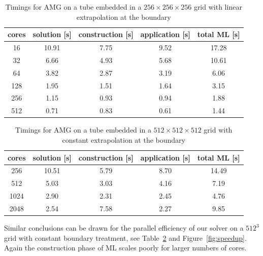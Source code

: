 \documentclass[a4paper,10pt,3p,preprint,pdftex]{elsarticle}
\begin{document}
\begin{table}[htb]
  \begin{center}
    \begin{tabular}{ccccc}
      \hline
      cores & solution [s] & construction [s] & application [s] & total ML [s] \\
      \hline
      16  & 10.91 &  7.75 &  9.52 & 17.28 \\
      32  &  6.66 &  4.93 &  5.68 & 10.61 \\
      64  &  3.82 &  2.87 &  3.19 &  6.06 \\
      128 &  1.95 &  1.51 &  1.64 &  3.15 \\
      256 &  1.15 &  0.93 &  0.94 &  1.88 \\
      512 &  0.71 &  0.83 &  0.61 &  1.44 \\
      \hline
    \end{tabular}
    \caption{Timings for AMG on a tube embedded in a $256\times256\times256$
      grid with linear extrapolation at the boundary}
    \label{tbl:timings_solver_256}
    \end{center}
\end{table}


\begin{table}[htb]
  \begin{center}
    \begin{tabular}{ccccc}
      \hline
      cores & solution [s] & construction [s] & application [s] & total ML [s] \\
      \hline
      256  &  10.51 &  5.79 &  8.70 &  14.49 \\
      512  &  5.03 &  3.03 &  4.16 &  7.19 \\
      1024 &  2.90 &  2.31 &  2.45 &  4.76 \\
      2048 &  2.54 &  7.58 &  2.27 &  9.85 \\
      \hline
    \end{tabular}
    \caption{Timings for AMG on a tube embedded in a $512\times512\times512$
      grid with constant extrapolation at the boundary}
    \label{tbl:timings_solver_512} 
  \end{center}
\end{table}

Similar conclusions can be drawn for the parallel efficiency of our
solver on a $512^3$ grid with constant boundary treatment, see
Table~\ref{tbl:timings_solver_512} and Figure~\ref{fig:speedup}.  Again the
construction phase of ML scales poorly for larger numbers of cores.
\end{document}
